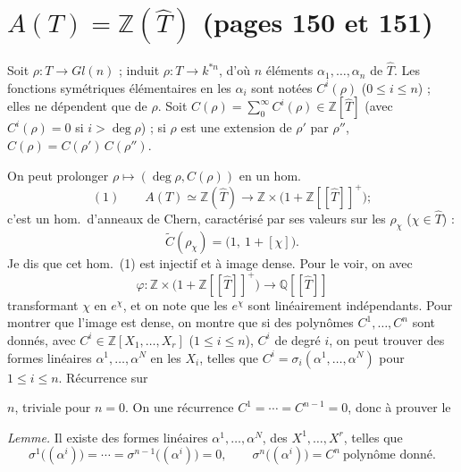 \documentclass[11pt,a4paper]{article}
\begin{document}
\section*{$A(T) = \mathbb{Z}(\hat{T})$ (pages 150 et 151)}


Soit $\rho : T \to Gl(n)$ ; \ill{} induit $\rho : T \to k^{*n}$, d'où $n$
éléments $\alpha_{1}, \ldots, \alpha_{n}$ de $\hat{T}$. Les fonctions symétriques
élémentaires en les $\alpha_{i}$ sont notées $C^{i}(\rho)$
($0 \leq i \leq n$) ; elles ne dépendent que de $\rho$. Soit
$C(\rho) = \sum_{0}^{\infty} C^{i}(\rho) \in \mathbb{Z}[\hat{T}]$
(avec $C^{i}(\rho) = 0$ si $i > \deg \rho$) ; si $\rho$ est une extension de
$\rho'$ par $\rho''$, \ill{} $C(\rho) = C(\rho')\, C(\rho'')$.

On peut prolonger $\rho \mapsto (\deg \rho, C(\rho))$ en un hom.\ \ill{}
\[ (1) \qquad A(T) \simeq \mathbb{Z}(\hat{T}) \longrightarrow
   \mathbb{Z} \times \bigl( 1 + \mathbb{Z}[[\hat{T}]]^{+} \bigr) ; \]
c'est un hom.\ d'anneaux de Chern, caractérisé par ses valeurs sur les
$\rho_{\chi}$ ($\chi \in \hat{T}$) :
\[ \tilde{C}(\rho_{\chi}) = \bigl( 1 ,\ 1 + [\chi] \bigr) . \]
Je dis que cet hom.\ (1) est injectif \struck{\ill{}} et à image dense. Pour le
voir, on \ill{} avec \ill{}
\[ \varphi : \mathbb{Z} \times \bigl( 1 + \mathbb{Z}[[\hat{T}]]^{+} \bigr)
   \longrightarrow \mathbb{Q}[[\hat{T}]] \]
transformant $\chi$ en $e^{\chi}$, et on note que les $e^{\chi}$ sont
linéairement indépendants. Pour montrer que l'image est dense, on montre que si
\struck{\ill{}} des polynômes $C^{1}, \ldots, C^{n}$ sont donnés,
\struck{\ill{}} avec $C^{i} \in \mathbb{Z}[X_{1}, \ldots, X_{r}]$
($1 \leq i \leq n$), $C^{i}$ de degré $i$, on peut trouver des formes linéaires
$\alpha^{1}, \ldots, \alpha^{N}$ en les $X_{i}$, telles que
$C^{i} = \sigma_{i}(\alpha^{1}, \ldots, \alpha^{N})$ pour $1 \leq i \leq n$.
Récurrence sur


$n$, triviale pour $n = 0$. On \ill{} une récurrence \ill{} $C^{1} = \cdots =
C^{n-1} = 0$, donc à prouver le

\emph{Lemme.} Il existe des formes linéaires $\alpha^{1}, \ldots, \alpha^{N}$,
\ill{} des $X^{1}, \ldots, X^{r}$, telles que
\[ \sigma^{1}\bigl((\alpha^{i})\bigr) = \cdots =
   \sigma^{n-1}\bigl((\alpha^{i})\bigr) = 0 , \qquad
   \sigma^{n}\bigl((\alpha^{i})\bigr) = C^{n} \ \text{polynôme donné} . \]

\end{document}
